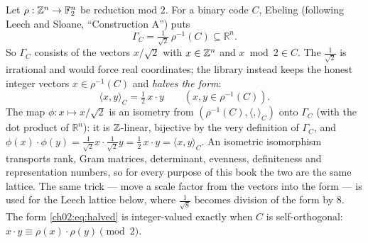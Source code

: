 Let $\rho:{\mathbb{Z}}^n\to\mathbb{F}_2^n$ be reduction mod $2$.  For a binary code $C$, Ebeling (following
Leech and Sloane, ``Construction A'') puts
\begin{equation*}
\Gamma_C=\tfrac1{\sqrt2}\,\rho^{-1}(C)\subseteq\mathbb{R}^n .
\end{equation*}
So $\Gamma_C$ consists of the vectors $x/\sqrt2$ with $x\in{\mathbb{Z}}^n$ and $x\bmod2\in C$.  The
$\tfrac1{\sqrt2}$ is irrational and would force real coordinates; the library instead keeps
the honest integer vectors $x\in\rho^{-1}(C)$ and \emph{halves the form}:
\begin{equation}\label{ch02:eq:halved}
\langle x,y\rangle_C=\tfrac12\,x\cdot y\qquad(x,y\in\rho^{-1}(C)).
\end{equation}
The map $\phi:x\mapsto x/\sqrt2$ is an isometry from $(\rho^{-1}(C),\langle,\rangle_C)$ onto
$\Gamma_C$ (with the dot product of $\mathbb{R}^n$): it is ${\mathbb{Z}}$-linear, bijective by the very
definition of $\Gamma_C$, and
$\phi(x)\cdot\phi(y)=\tfrac1{\sqrt2}x\cdot\tfrac1{\sqrt2}y=\tfrac12\,x\cdot y=\langle
x,y\rangle_C$.  An isometric isomorphism transports rank, Gram matrices, determinant, evenness,
definiteness and representation numbers, so for every purpose of this book the two are the same
lattice.  The same trick --- move a scale factor from the vectors into the form --- is used for
the Leech lattice below, where $\tfrac1{\sqrt8}$ becomes division of the form by $8$.  The form \eqref{ch02:eq:halved} is integer-valued
exactly when $C$ is self-orthogonal: $x\cdot y\equiv\rho(x)\cdot\rho(y)\pmod 2$.


